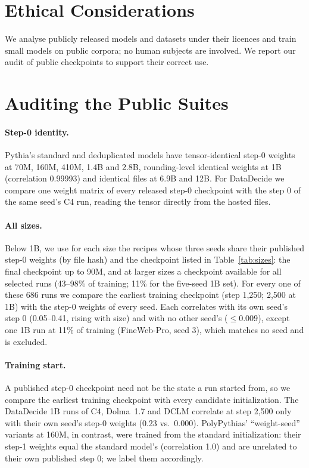 \documentclass[11pt]{article}
\begin{document}
\section*{Ethical Considerations}
We analyse publicly released models and datasets under their licences and train small models on public corpora; no human subjects are involved.
We report our audit of public checkpoints to support their correct use.



\appendix

\section{Auditing the Public Suites}
\label{app:audit}



\paragraph{Step-0 identity.}
Pythia's standard and deduplicated models have tensor-identical step-0 weights at 70M, 160M, 410M, 1.4B and 2.8B, rounding-level identical weights at 1B (correlation 0.99993) and identical files at 6.9B and 12B.
For DataDecide we compare one weight matrix of every released step-0 checkpoint with the step 0 of the same seed's C4 run, reading the tensor directly from the hosted files.

\paragraph{All sizes.}
Below 1B, we use for each size the recipes whose three seeds share their published step-0 weights (by file hash) and the checkpoint listed in Table~\ref{tab:sizes}: the final checkpoint up to 90M, and at larger sizes a checkpoint available for all selected runs (43--98\% of training; 11\% for the five-seed 1B set).
For every one of these 686 runs we compare the earliest training checkpoint (step 1{,}250; 2{,}500 at 1B) with the step-0 weights of every seed.
Each correlates with its own seed's step 0 (0.05--0.41, rising with size) and with no other seed's ($\le 0.009$), except one 1B run at 11\% of training (FineWeb-Pro, seed 3), which matches no seed and is excluded.

\paragraph{Training start.}
A published step-0 checkpoint need not be the state a run started from, so we compare the earliest training checkpoint with every candidate initialization.
The DataDecide 1B runs of C4, Dolma~1.7 and DCLM correlate at step 2{,}500 only with their own seed's step-0 weights (0.23 vs.\ 0.000).
PolyPythias' ``weight-seed'' variants at 160M, in contrast, were trained from the standard initialization: their step-1 weights equal the standard model's (correlation 1.0) and are unrelated to their own published step 0; we label them accordingly.
\end{document}
